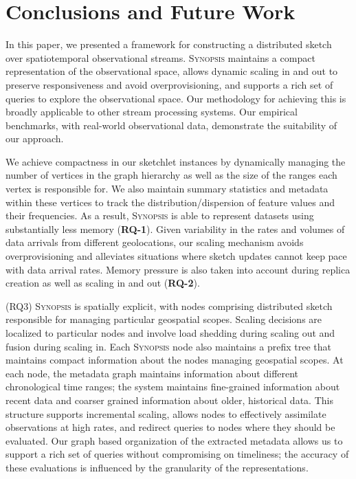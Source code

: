 \section{Conclusions and Future Work}
\label{sec:conclusions}
In this paper, we presented a framework for constructing a distributed sketch over spatiotemporal observational streams. \textsc{Synopsis} maintains a compact representation of the observational space, allows dynamic scaling in and out to preserve responsiveness and avoid overprovisioning, and supports a rich set of queries to explore the observational space. Our methodology for achieving this is broadly applicable to other stream processing systems.  Our empirical benchmarks, with real-world observational data, demonstrate the suitability of our approach.

We achieve compactness in our sketchlet instances by dynamically managing the number of vertices in the graph hierarchy as well as the size of the ranges each vertex is responsible for. We also maintain summary statistics and metadata within these vertices to track the distribution/dispersion of feature values and their frequencies. As a result, \textsc{Synopsis} is able to represent datasets using substantially less memory (\textbf{RQ-1}). Given variability in the rates and volumes of data arrivals from different geolocations, our scaling mechanism avoids overprovisioning and alleviates situations where sketch updates cannot keep pace with data arrival rates. Memory pressure is also taken into account during replica creation as well as scaling in and out (\textbf{RQ-2}).

(RQ3) \textsc{Synopsis} is spatially explicit, with nodes comprising distributed sketch responsible for managing particular geospatial scopes. Scaling decisions are localized to particular nodes and involve load shedding during scaling out and fusion during scaling in. Each \textsc{Synopsis} node also maintains a prefix tree that maintains compact information about the nodes managing geospatial scopes. At each node, the metadata graph maintains information about different chronological time ranges; the system maintains fine-grained information about recent data and coarser grained information about older, historical data. This structure supports incremental scaling, allows nodes to effectively assimilate observations at high rates, and redirect queries to nodes where they should be evaluated. Our graph based organization of the extracted metadata allows us to support a rich set of queries without compromising on timeliness; the accuracy of these evaluations is influenced by the granularity of the representations.  

